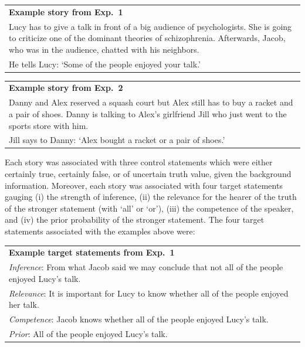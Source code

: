 \documentclass[12pt]{article}
\begin{document}
\begin{center}
\begin{tabular}{p{10cm}}
\textbf{Example story from Exp.\ 1} \\
  Lucy has to give a talk in front of a big audience of psychologists. She is going to criticize one of the dominant theories of schizophrenia. Afterwards, Jacob, who was in the audience, chatted with his neighbors.\\[.2cm]
  He tells Lucy: `Some of the people enjoyed your talk.'
\end{tabular}
\end{center}


\begin{center}
\begin{tabular}{p{10cm}}
\textbf{Example story from Exp.\ 2} \\
  Danny and Alex reserved a squash court but Alex still has to buy a racket and a pair of
  shoes. Danny is talking to Alex's girlfriend Jill who just went to the sports store with
  him.\\[.2cm]
  Jill says to Danny: `Alex bought a racket or a pair of shoes.'
\end{tabular}
\end{center}

\noindent Each story was associated with three control statements which were either certainly
true, certainly false, or of uncertain truth value, given the background information. Moreover,
each story was associated with four target statements gauging (i) the strength of inference,
(ii) the relevance for the hearer of the truth of the stronger statement (with `all' or
`or'), (iii) the competence of the speaker, and (iv) the prior probability of the stronger
statement. The four target statements associated with the examples above were:

\begin{center}
\begin{tabular}{p{10cm}}
\textbf{Example target statements from Exp.\ 1} \\[.2cm]
\emph{Inference}: From what Jacob said we may conclude that not all of the people enjoyed Lucy's talk.\\[.1cm]
\emph{Relevance}: It is important for Lucy to know whether all of the people enjoyed her talk.\\[.1cm]
  \emph{Competence}: Jacob knows whether all of the people enjoyed Lucy's talk. \\[.1cm]
  \emph{Prior}: All of the people enjoyed Lucy's talk.
\end{tabular}
\end{center}
\end{document}
